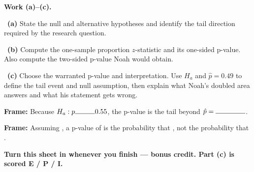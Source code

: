 \documentclass[11pt]{article}
\begin{document}
\newpage
\textbf{Work (a)--(c).}\par\smallskip

~\textbf{(a)} State the null and alternative hypotheses and identify the tail direction required by the research question.\par
\workspace{0.7in}

~\textbf{(b)} Compute the one-sample proportion $z$-statistic and its one-sided p-value. Also compute the two-sided p-value Noah would obtain.\par
\workspace{1.4in}

~\textbf{(c)} Choose the warranted p-value and interpretation. Use $H_a$ and $\hat p=0.49$ to define the tail event and null assumption, then explain what Noah's doubled area answers and what his statement gets wrong.\par
\workspace{2.0in}

\begin{sentenceframebox}\raggedright\textbf{Frame:} Because $H_a:p\blank[0.4in]0.55$, the p-value is the \blank[0.8in] tail beyond $\hat p=\blank[0.6in]$.\end{sentenceframebox}

\begin{sentenceframebox}\raggedright\textbf{Frame:} Assuming \blank[1.8in], a p-value of \blank[0.7in] is the probability that \blank[3.2in], not the probability that \blank[2.0in].\end{sentenceframebox}

\textbf{Turn this sheet in whenever you finish --- bonus credit. Part (c) is scored E / P / I.}\par
\end{document}
